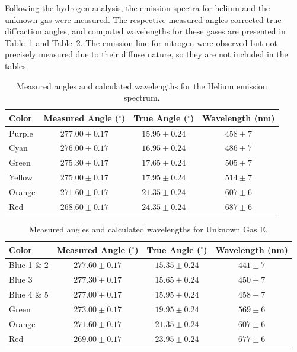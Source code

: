 \documentclass[11pt]{article}
\begin{document}
        Following the hydrogen analysis, the emission spectra for helium and
        the unknown gas were measured.
        The respective measured angles corrected true diffraction angles, and
        computed wavelengths for these gases are presented in
        Table~\ref{tab:helium_emission_lines} and
        Table~\ref{tab:unknown_emission_lines}.
        The emission line for nitrogen were observed but not precisely
        measured due to their diffuse nature, so they are not included in the
        tables.

        \begin{table}[htbp]
            \centering
            \caption{Measured angles and calculated wavelengths for the Helium emission spectrum.}
            \label{tab:helium_emission_lines}
            \begin{tabular}{lccc}
                \toprule
                Color & Measured Angle ($^\circ$) & True Angle ($^\circ$) & Wavelength (nm) \\
                \midrule
                Purple & $277.00 \pm 0.17$ & $15.95 \pm 0.24$ & $458 \pm 7$ \\
                Cyan   & $276.00 \pm 0.17$ & $16.95 \pm 0.24$ & $486 \pm 7$ \\
                Green  & $275.30 \pm 0.17$ & $17.65 \pm 0.24$ & $505 \pm 7$ \\
                Yellow & $275.00 \pm 0.17$ & $17.95 \pm 0.24$ & $514 \pm 7$ \\
                Orange & $271.60 \pm 0.17$ & $21.35 \pm 0.24$ & $607 \pm 6$ \\
                Red    & $268.60 \pm 0.17$ & $24.35 \pm 0.24$ & $687 \pm 6$ \\
                \bottomrule
            \end{tabular}
        \end{table}

        \begin{table}[htbp]
            \centering
            \caption{Measured angles and calculated wavelengths for Unknown Gas E.}
            \label{tab:unknown_emission_lines}
            \begin{tabular}{lccc}
                \toprule
                Color & Measured Angle ($^\circ$) & True Angle ($^\circ$) & Wavelength (nm) \\
                \midrule
                Blue 1 \& 2 & $277.60 \pm 0.17$ & $15.35 \pm 0.24$ & $441 \pm 7$ \\
                Blue 3      & $277.30 \pm 0.17$ & $15.65 \pm 0.24$ & $450 \pm 7$ \\
                Blue 4 \& 5 & $277.00 \pm 0.17$ & $15.95 \pm 0.24$ & $458 \pm 7$ \\
                Green       & $273.00 \pm 0.17$ & $19.95 \pm 0.24$ & $569 \pm 6$ \\
                Orange      & $271.60 \pm 0.17$ & $21.35 \pm 0.24$ & $607 \pm 6$ \\
                Red         & $269.00 \pm 0.17$ & $23.95 \pm 0.24$ & $677 \pm 6$ \\
                \bottomrule
            \end{tabular}
        \end{table}
\end{document}
